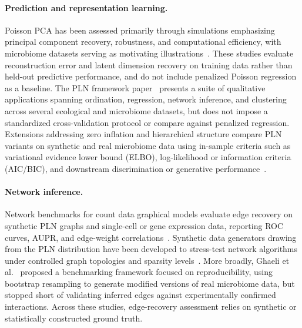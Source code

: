 \documentclass{jmlr}
\begin{document}
\paragraph{Prediction and representation learning.}
Poisson PCA has been assessed primarily through simulations emphasizing principal component recovery, robustness, and computational efficiency, with microbiome datasets serving as motivating illustrations~\cite{Kenney2021PoissonPCA, Virta2023PoissonPCA}.
These studies evaluate reconstruction error and latent dimension recovery on training data rather than held-out predictive performance, and do not include penalized Poisson regression as a baseline.
The PLN framework paper~\cite{Chiquet2021} presents a suite of qualitative applications spanning ordination, regression, network inference, and clustering across several ecological and microbiome datasets, but does not impose a standardized cross-validation protocol or compare against penalized regression.
Extensions addressing zero inflation and hierarchical structure compare PLN variants on synthetic and real microbiome data using in-sample criteria such as variational evidence lower bound (ELBO), log-likelihood or information criteria (AIC/BIC), and downstream discrimination or generative performance~\cite{Batardiere2025ZIPLN, Chaussard2025PLNTree}.

\paragraph{Network inference.}
Network benchmarks for count data graphical models evaluate edge recovery on synthetic PLN graphs and single-cell or gene expression data, reporting ROC curves, AUPR, and edge-weight correlations~\cite{Xiao2022PLNet}.
Synthetic data generators drawing from the PLN distribution have been developed to stress-test network algorithms under controlled graph topologies and sparsity levels~\cite{Qian2024}.
More broadly, Ghaeli et al.~\cite{Ghaeli2025} proposed a benchmarking framework focused on reproducibility, using bootstrap resampling to generate modified versions of real microbiome data, but stopped short of validating inferred edges against experimentally confirmed interactions.
Across these studies, edge-recovery assessment relies on synthetic or statistically constructed ground truth.
\end{document}
